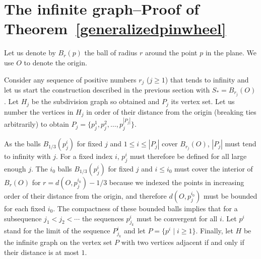 \documentclass[12pt]{article}
\theoremstyle{plain}
\newtheorem{theorem}{Theorem}
\theoremstyle{definition}
\theoremstyle{remark}
\begin{document}

\section{The infinite graph--Proof of Theorem~\ref{generalizedpinwheel}}\label{sec5}

Let us denote by $B_r(p)$ the ball of radius $r$ around the point $p$ in the plane. We use $O$ to denote the origin.

Consider any sequence of positive numbers $r_j$ ($j\ge1$) that tends to infinity and let us start the construction described in the previous section with $S_*=B_{r_j}(O)$. Let $H_j$ be the subdivision graph so obtained and $P_j$ its vertex set. Let us number the vertices in $H_j$ in order of their distance from the origin (breaking ties arbitrarily) to obtain $P_j=\{p_j^1,p_j^2,\dots,p_j^{|P_j|}\}$.

As the balls $B_{1/3}(p_j^i)$ for fixed $j$ and $1\le i\le|P_j|$ cover $B_{r_j}(O)$, $|P_j|$ must tend to infinity with $j$. For a fixed index $i$, $p_j^i$ must therefore be defined for all large enough $j$. The $i_0$ balls $B_{1/3}(p_j^i)$ for fixed $j$ and $i\le i_0$ must cover the interior of $B_r(O)$ for $r=d(O,p_j^{i_0})-1/3$ because we indexed the points in increasing order of their distance from the origin, and therefore $d(O,p_j^{i_0})$ must be bounded for each fixed $i_0$. The compactness of these bounded balls implies that for a subsequence $j_1<j_2<\cdots$ the sequences $p_{j_k}^i$ must be convergent for all $i$. Let $p^i$ stand for the limit of the sequence $P_{j_k}^i$ and let $P=\{p^i\mid i\ge1\}$. Finally, let $H$ be the infinite graph on the vertex set $P$ with two vertices adjacent if and only if their distance is at most $1$.
\end{document}
